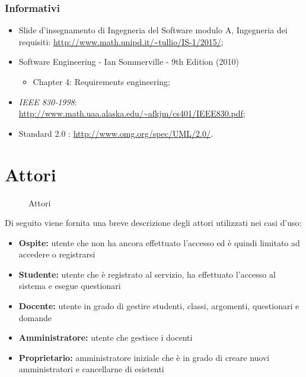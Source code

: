 \documentclass[12pt,a4paper]{article}
\begin{document}
\subsubsection{Informativi}
	\begin{itemize}
		\item Slide d’insegnamento di Ingegneria del Software modulo A, Ingegneria dei requisiti: \url{http://www.math.unipd.it/~tullio/IS-1/2015/};
		\item Software Engineering - Ian Sommerville - 9th Edition (2010)
		\begin{itemize}
			\item Chapter 4: Requirements engineering;
		\end{itemize}
		\item \textit{IEEE 830-1998}: \url{http://www.math.uaa.alaska.edu/~afkjm/cs401/IEEE830.pdf};
		\item Standard  2.0 :
		\url{http://www.omg.org/spec/UML/2.0/}.
	\end{itemize}


\section{Attori}

\begin{figure}[H]
    \centering
    \caption{Attori}
    \label{fig:actors} 
\end{figure}

Di seguito viene fornita una breve descrizione degli attori utilizzati nei casi d'uso:

\begin{itemize}
    \item \textbf{Ospite:} utente che non ha ancora effettuato l'accesso ed è quindi limitato
        ad accedere o registrarsi
    \item \textbf{Studente:} utente che è registrato al servizio, ha effettuato l'accesso al
        sistema e esegue questionari
    \item \textbf{Docente:} utente in grado di gestire studenti, classi, argomenti, questionari
        e domande
    \item \textbf{Amministratore:} utente che gestisce i docenti
    \item \textbf{Proprietario:} amministratore iniziale che è in grado di creare nuovi amministratori
        e cancellarne di esistenti
\end{itemize}
\end{document}
